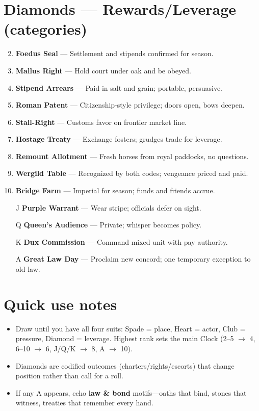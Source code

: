 \section*{Diamonds --- Rewards/Leverage (categories)}
\label{sec:vilikari-rewards}
\begin{enumerate}
\setcounter{enumi}{1}
\item \textbf{Foedus Seal} --- Settlement and stipends confirmed for season.
\item \textbf{Mallus Right} --- Hold court under oak and be obeyed.
\item \textbf{Stipend Arrears} --- Paid in salt and grain; portable, persuasive.
\item \textbf{Roman Patent} --- Citizenship-style privilege; doors open, bows deepen.
\item \textbf{Stall-Right} --- Customs favor on frontier market line.
\item \textbf{Hostage Treaty} --- Exchange fosters; grudges trade for leverage.
\item \textbf{Remount Allotment} --- Fresh horses from royal paddocks, no questions.
\item \textbf{Wergild Table} --- Recognized by both codes; vengeance priced and paid.
\item \textbf{Bridge Farm} --- Imperial for season; funds and friends accrue.
\item[J] \textbf{Purple Warrant} --- Wear stripe; officials defer on sight.
\item[Q] \textbf{Queen's Audience} --- Private; whisper becomes policy.
\item[K] \textbf{Dux Commission} --- Command mixed unit with pay authority.
\item[A] \textbf{Great Law Day} --- Proclaim new concord; one temporary exception to old law.
\end{enumerate}

\section*{Quick use notes}
\label{sec:vilikari-quick-use}
\begin{itemize}
\item Draw until you have all four suits: Spade = place, Heart = actor, Club = pressure, Diamond = leverage. Highest rank sets the main Clock (2--5 $\rightarrow$ 4, 6--10 $\rightarrow$ 6, J/Q/K $\rightarrow$ 8, A $\rightarrow$ 10).
\item Diamonds are codified outcomes (charters/rights/escorts) that change position rather than call for a roll.
\item If any A appears, echo \textbf{law \& bond} motifs---oaths that bind, stones that witness, treaties that remember every hand.
\end{itemize}

